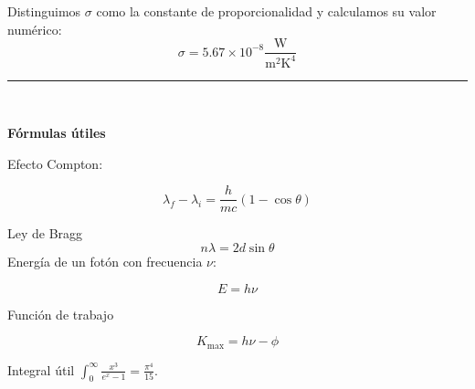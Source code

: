 \documentclass[12pt]{article}
\begin{document}
Distinguimos $\sigma$ como la constante de proporcionalidad y calculamos su valor numérico:
\begin{equation*}
\sigma = 5.67\times 10^{-8} \frac{\text{W}}{\text{m}^2 \text{K}^4}
\end{equation*}

\noindent\rule{16.5cm}{0.4pt}
\\

\begin{center}
\textbf{Fórmulas útiles}
\end{center}



Efecto Compton:

\begin{equation*}
\lambda_f - \lambda_i = \frac{h}{mc}(1-\cos\theta)
\end{equation*}

Ley de Bragg
\begin{equation*}
n \lambda = 2 d \sin\theta
\end{equation*}
Energía de un fotón con frecuencia $\nu$:


\begin{equation*}
E  = h \nu 
\end{equation*}


Función de trabajo

\begin{equation*}
K_{\text{max}} = h \nu - \phi
\end{equation*}

Integral útil $ \int_{0}^{\infty}\frac{x^3}{e^{x}-1}= \frac{\pi^4}{15}$.
\end{document}

